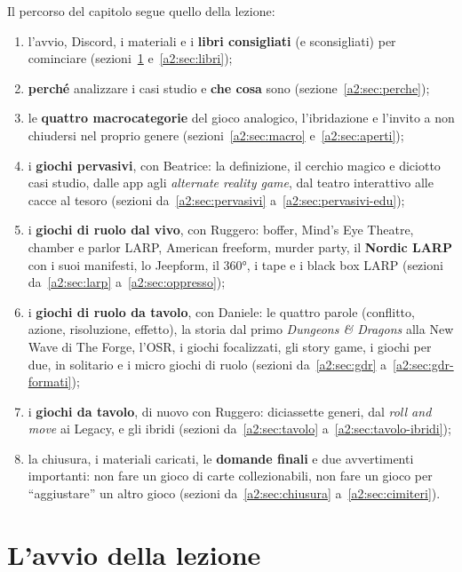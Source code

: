 Il percorso del capitolo segue quello della lezione:
\begin{enumerate}
  \item l'avvio, Discord, i materiali e i \textbf{libri consigliati} (e
        sconsigliati) per cominciare (sezioni~\ref{a2:sec:avvio}
        e~\ref{a2:sec:libri});
  \item \textbf{perché} analizzare i casi studio e \textbf{che cosa} sono
        (sezione~\ref{a2:sec:perche});
  \item le \textbf{quattro macrocategorie} del gioco analogico, l'ibridazione e
        l'invito a non chiudersi nel proprio genere (sezioni~\ref{a2:sec:macro}
        e~\ref{a2:sec:aperti});
  \item i \textbf{giochi pervasivi}, con Beatrice: la definizione, il cerchio
        magico e diciotto casi studio, dalle app agli \emph{alternate reality
        game}, dal teatro interattivo alle cacce al tesoro
        (sezioni da~\ref{a2:sec:pervasivi} a~\ref{a2:sec:pervasivi-edu});
  \item i \textbf{giochi di ruolo dal vivo}, con Ruggero: boffer, Mind's Eye
        Theatre, chamber e parlor LARP, American freeform, murder party, il
        \textbf{Nordic LARP} con i suoi manifesti, lo Jeepform, il 360°, i tape
        e i black box LARP (sezioni da~\ref{a2:sec:larp} a~\ref{a2:sec:oppresso});
  \item i \textbf{giochi di ruolo da tavolo}, con Daniele: le quattro parole
        (conflitto, azione, risoluzione, effetto), la storia dal primo
        \emph{Dungeons \& Dragons} alla New Wave di The Forge, l'OSR, i giochi
        focalizzati, gli story game, i giochi per due, in solitario e i micro
        giochi di ruolo (sezioni da~\ref{a2:sec:gdr} a~\ref{a2:sec:gdr-formati});
  \item i \textbf{giochi da tavolo}, di nuovo con Ruggero: diciassette generi,
        dal \emph{roll and move} ai Legacy, e gli ibridi
        (sezioni da~\ref{a2:sec:tavolo} a~\ref{a2:sec:tavolo-ibridi});
  \item la chiusura, i materiali caricati, le \textbf{domande finali} e due
        avvertimenti importanti: non fare un gioco di carte collezionabili, non
        fare un gioco per ``aggiustare'' un altro gioco
        (sezioni da~\ref{a2:sec:chiusura} a~\ref{a2:sec:cimiteri}).
\end{enumerate}

\section{L'avvio della lezione}
\label{a2:sec:avvio}

